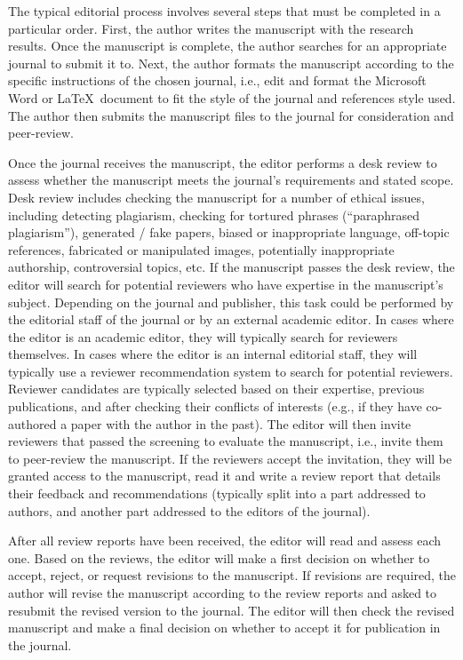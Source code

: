 \documentclass{article}
\begin{document}
The typical editorial process involves several steps that must be completed in a particular order. First, the author writes the manuscript
with the research results. Once the manuscript is complete, the author searches for an appropriate journal to submit it to. Next, the author
formats the manuscript according to the specific instructions of the chosen journal, i.e., edit and format the Microsoft Word or \LaTeX~document
to fit the style of the journal and references style used. The author then submits the manuscript files to the journal for consideration and
peer-review. 

Once the journal receives the manuscript, the editor performs a desk review to assess whether the manuscript meets the journal's requirements
and stated scope. Desk review includes checking the manuscript for a number of ethical issues, including detecting plagiarism, checking for tortured
phrases (``paraphrased plagiarism''), generated / fake papers, biased or inappropriate language, off-topic references, fabricated or manipulated
images, potentially inappropriate authorship, controversial topics, etc. If the manuscript passes the desk review, the editor will search for potential
reviewers who have expertise in the manuscript's subject. Depending on the journal and publisher, this task could be performed by the editorial staff of
the journal or by an external academic editor. In cases where the editor is an academic editor, they will typically search for reviewers
themselves. In cases where the editor is an internal editorial staff, they will typically use a reviewer recommendation system to search
for potential reviewers. Reviewer candidates are typically selected based on their expertise, previous publications, and after checking 
their conflicts of interests (e.g., if they have co-authored a paper with the author in the past). The editor will then invite reviewers
that passed the screening to evaluate the manuscript, i.e., invite them to peer-review the manuscript. If the reviewers accept the invitation,
they will be granted access to the manuscript, read it and write a review report that details their feedback and recommendations (typically
split into a part addressed to authors, and another part addressed to the editors of the journal). 

After all review reports have been received, the editor will read and assess each one. Based on the reviews, the editor will make a first
decision on whether to accept, reject, or request revisions to the manuscript. If revisions are required, the author will revise the manuscript
according to the review reports and asked to resubmit the revised version to the journal. The editor will then check the revised manuscript
and make a final decision on whether to accept it for publication in the journal.
\end{document}
